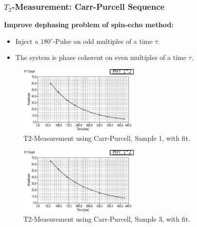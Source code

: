 \documentclass[aspectratio=169]{beamer}
\begin{document}
\begin{frame}
	\frametitle{$T_2$-Measurement: Carr-Purcell Sequence}
	\textbf{Improve dephasing problem of spin-echo method:}
	\begin{itemize}
		\item Inject a $180^\circ$-Pulse on odd multiples of a time $\tau$.
		\item The system is phase coherent on even multiples of a time $\tau$.
	\end{itemize}
	\pause
	\begin{minipage}[t]{0.45\textwidth}
		\centering
		\begin{figure}
			\includegraphics[width=60mm]{./Resources/t2_p1_cp.eps}
			\caption{T2-Measurement using Carr-Purcell, Sample 1, with fit.}
			\label{fig:t2_p1_cp}
		\end{figure}
	\end{minipage}
	\hfill
	\begin{minipage}[t]{0.45\textwidth}
		\centering
		\begin{figure}
			\includegraphics[width=60mm]{./Resources/t2_p3_cp.eps}
			\caption{T2-Measurement using Carr-Purcell, Sample 3, with fit.}
			\label{fig:t2_p3_cp}
		\end{figure}
	\end{minipage}
\end{frame}
\end{document}
